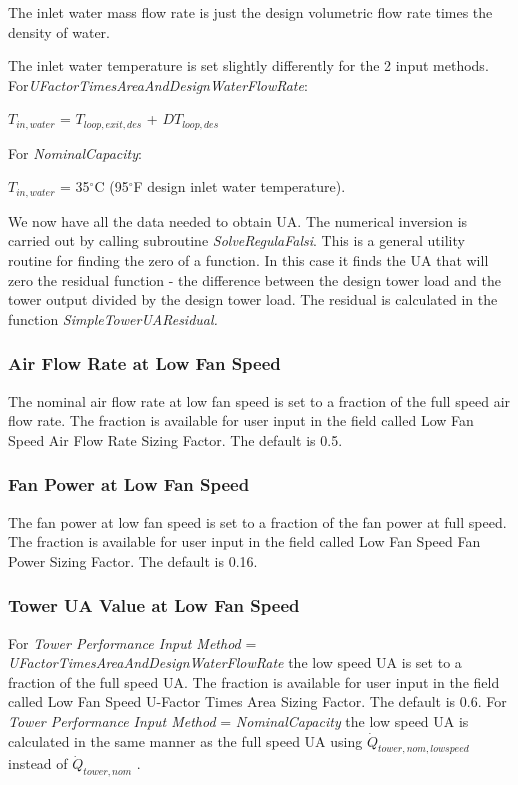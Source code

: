 The inlet water mass flow rate is just the design volumetric flow rate times the density of water.

The inlet water temperature is set slightly differently for the 2 input methods. For\emph{UFactorTimesAreaAndDesignWaterFlowRate}:

\(T_{in,water}\) = \(T_{loop,exit,des}\) + \(DT_{loop,des}\)

For \emph{NominalCapacity}:

\(T_{in,water}\) = 35\(^{\circ}\)C (95\(^{\circ}\)F design inlet water temperature).

We now have all the data needed to obtain UA. The numerical inversion is carried out by calling subroutine \emph{SolveRegulaFalsi}. This is a general utility routine for finding the zero of a function. In this case it finds the UA that will zero the residual function - the difference between the design tower load and the tower output divided by the design tower load. The residual is calculated in the function \emph{SimpleTowerUAResidual.}

\subsubsection{Air Flow Rate at Low Fan Speed}\label{air-flow-rate-at-low-fan-speed}

The nominal air flow rate at low fan speed is set to a fraction of the full speed air flow rate. The fraction is available for user input in the field called Low Fan Speed Air Flow Rate Sizing Factor. The default is 0.5.

\subsubsection{Fan Power at Low Fan Speed}\label{fan-power-at-low-fan-speed}

The fan power at low fan speed is set to a fraction of the fan power at full speed. The fraction is available for user input in the field called Low Fan Speed Fan Power Sizing Factor. The default is 0.16.

\subsubsection{Tower UA Value at Low Fan Speed}\label{tower-ua-value-at-low-fan-speed}

For \emph{Tower Performance Input Method} = \emph{UFactorTimesAreaAndDesignWaterFlowRate} the low speed UA is set to a fraction of the full speed UA. The fraction is available for user input in the field called Low Fan Speed U-Factor Times Area Sizing Factor. The default is 0.6. For \emph{Tower Performance Input Method} = \emph{NominalCapacity} the low speed UA is calculated in the same manner as the full speed UA using \(\dot Q_{tower,nom,lowspeed}\) instead of \(\dot Q_{tower,nom}\) .

